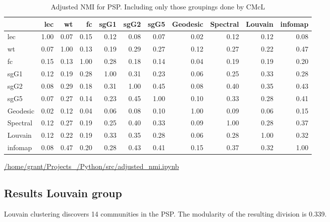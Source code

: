\begin{table}[ht]
\centering
\begin{adjustbox}{width=\textwidth}

\setlength{\extrarowheight}{2pt}
\begin{tabular}{lrrrrrrrrrr}
\toprule
{} &  lec &   wt &   fc &  sgG1 &  sgG2 &  sgG5 &  Geodesic &  Spectral &  Louvain &  infomap \\
\midrule
lec      & 1.00 & 0.07 & 0.15 &  0.12 &  0.08 &  0.07 &      0.02 &      0.12 &      0.12 &     0.08 \\
wt       & 0.07 & 1.00 & 0.13 &  0.19 &  0.29 &  0.27 &      0.12 &      0.27 &      0.22 &     0.47 \\
fc       & 0.15 & 0.13 & 1.00 &  0.28 &  0.18 &  0.14 &      0.04 &      0.19 &      0.19 &     0.20 \\
sgG1     & 0.12 & 0.19 & 0.28 &  1.00 &  0.31 &  0.23 &      0.06 &      0.25 &      0.33 &     0.28 \\
sgG2     & 0.08 & 0.29 & 0.18 &  0.31 &  1.00 &  0.45 &      0.08 &      0.40 &      0.35 &     0.43 \\
sgG5     & 0.07 & 0.27 & 0.14 &  0.23 &  0.45 &  1.00 &      0.10 &      0.33 &      0.28 &     0.41 \\
Geodesic & 0.02 & 0.12 & 0.04 &  0.06 &  0.08 &  0.10 &      1.00 &      0.09 &      0.06 &     0.15 \\
Spectral & 0.12 & 0.27 & 0.19 &  0.25 &  0.40 &  0.33 &      0.09 &      1.00 &      0.28 &     0.37 \\
Louvain & 0.12 & 0.22 & 0.19 &  0.33 &  0.35 &  0.28 &      0.06 &      0.28 &      1.00 &     0.32 \\
infomap  & 0.08 & 0.47 & 0.20 &  0.28 &  0.43 &  0.41 &      0.15 &      0.37 &      0.32 &     1.00 \\
\bottomrule
\end{tabular}
\end{adjustbox}
\caption{Adjusted NMI for PSP. Including only those groupings done by CMcL}
\tiny\url{/home/grant/Projects_/Python/src/adjusted_nmi.ipynb}
\label{tab:adjusted NMI for PSP}
\end{table}


\subsection{Results Louvain group}
Louvain clustering discovers 14 communities in the PSP. The modularity of the resulting division is 0.339. 

